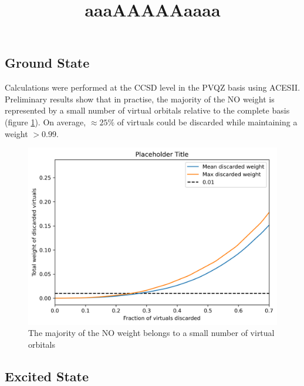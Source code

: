 \documentclass[letterpaper, 12pt]{article}
\begin{document}
\subsection{Ground State}
Calculations were performed at the CCSD level in the PVQZ basis using ACESII. Preliminary results show that in practise, the majority of the NO weight is represented by a small number of virtual orbitals relative to the complete basis (figure \ref{fig:weight_of_kept_orbitals}). On average, $\approx 25\%$ of virtuals could be discarded while maintaining a weight $ > 0.99$. 
\begin{figure}[H]
\title{aaaAAAAAaaaa}
\includegraphics[scale=1]{images/percent_virt_disc_weight.png}
\caption{The majority of the NO weight belongs to a small number of virtual orbitals}
\label{fig:weight_of_kept_orbitals}

\end{figure}
\subsection{Excited State}



\end{document}
